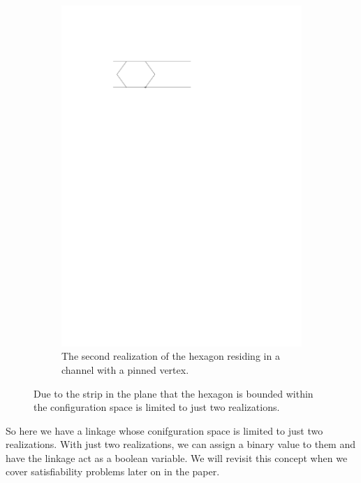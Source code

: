 \begin{figure}[h]
\begin{center}
\begin{subfigure}[b]{0.49\textwidth}
	  \includegraphics[width=\textwidth]{graphics/hexagonInChannelWithPinnedJointLeft.pdf}
	  \caption{The second realization of the hexagon residing in a channel with a pinned vertex.}
	  \label{fig:linkage-1-2}
  \end{subfigure}
\end{center} 
\caption{Due to the strip in the plane that the hexagon is bounded within the configuration space is limited to just two realizations.}\label{fig:linkage-1}
\end{figure}
So here we have a linkage whose conifguration space is limited to just two realizations.  With just two realizations, we can assign a binary value to them and have the linkage act as a boolean variable.  We will revisit this concept when we cover satisfiability problems later on in the paper.
